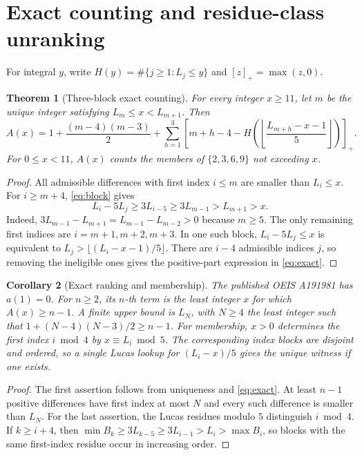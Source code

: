 \documentclass[11pt]{article}
\newtheorem{theorem}{Theorem}
\newtheorem{corollary}[theorem]{Corollary}
\begin{document}
\section*{Exact counting and residue-class unranking}
For integral $y$, write $H(y)=\#\{j\ge1:L_j\le y\}$ and $[z]_+=\max(z,0)$.
\begin{theorem}[Three-block exact counting]\label{thm:exact}
For every integer $x\ge11$, let $m$ be the unique integer satisfying
$L_m\le x<L_{m+1}$. Then
\begin{equation}\label{eq:exact}
\boxed{\displaystyle A(x)=1+\frac{(m-4)(m-3)}2+
\sum_{h=1}^{3}\left[m+h-4-
H\!\left(\left\lfloor\frac{L_{m+h}-x-1}{5}\right\rfloor\right)
\right]_+.}
\end{equation}
For $0\le x<11$, $A(x)$ counts the members of $\{2,3,6,9\}$ not exceeding $x$.
\end{theorem}
\begin{proof}
All admissible differences with first index $i\le m$ are smaller than
$L_i\le x$. For $i\ge m+4$, \eqref{eq:block} gives
\[
L_i-5L_j\ge3L_{i-5}\ge3L_{m-1}>L_{m+1}>x.
\]
Indeed, $3L_{m-1}-L_{m+1}=L_{m-1}-L_{m-2}>0$ because $m\ge5$.
The only remaining first indices are $i=m+1,m+2,m+3$. In one such block,
$L_i-5L_j\le x$ is equivalent to
$L_j>\lfloor(L_i-x-1)/5\rfloor$.
There are $i-4$ admissible indices $j$, so removing the ineligible ones gives
the positive-part expression in \eqref{eq:exact}.
\end{proof}

\begin{corollary}[Exact ranking and membership]\label{cor:algorithm}
The published OEIS A191981 has $a(1)=0$.
For $n\ge2$, its $n$-th term is the least integer $x$ for which
$A(x)\ge n-1$. A finite upper bound is $L_N$, with $N\ge4$ the least
integer such that $1+(N-4)(N-3)/2\ge n-1$.
For membership, $x>0$ determines the first index $i\bmod4$ by
$x\equiv L_i\bmod5$. The corresponding index blocks are disjoint
and ordered, so a single Lucas lookup for $(L_i-x)/5$ gives the
unique witness if one exists.
\end{corollary}
\begin{proof}
The first assertion follows from uniqueness and \eqref{eq:exact}.
At least $n-1$ positive differences have first index at most $N$ and
every such difference is smaller than $L_N$. For the last assertion,
the Lucas residues modulo $5$ distinguish $i\bmod4$.
If $k\ge i+4$, then
$\min B_k\ge3L_{k-5}\ge3L_{i-1}>L_i>\max B_i$,
so blocks with the same first-index residue occur in increasing order.
\end{proof}
\end{document}
